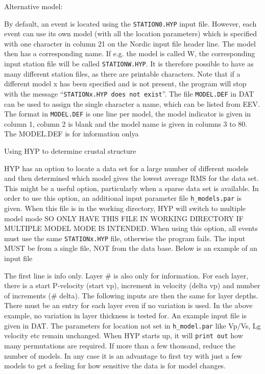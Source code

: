 Alternative model: 

By default, an event is located using the \texttt{STATION0.HYP} 
input file. However, each event can use its own model (with all the 
location parameters) which is specified with one character in column 
21 on the Nordic input file header line. The model then has a 
corresponding name. If e.g. the model is called W, the corresponding 
input station file will be called \texttt{STATIONW.HYP}. It is 
therefore possible to have as many different station files, as there 
are printable characters. Note that if a different model x has been 
specified and is not present, the program will stop with the message 
``\texttt{STATIONx.HYP does not exist}''. 
The file \texttt{MODEL.DEF} in DAT can be used 
to assign the single character a name, which can be listed from EEV. 
The format in \texttt{MODEL.DEF} is one line per model, the 
model indicator is given in column 1, column 2 is blank and the 
model name is given in columns 3 to 80. The MODEL.DEF is for information onlya 

Using HYP to determine crustal structure 

HYP has an option to locate a data set for a large number of different 
models and then determined which model gives the lowest average RMS 
for the data set. This might be a useful option, particularly when 
a sparse data set is available. In order to use this option, an 
additional input parameter file \texttt{h\_models.par} is given. 
When this file is in the working directory, HYP will switch to 
multiple model mode SO ONLY HAVE THIS FILE IN WORKING DIRECTORY IF 
MULTIPLE MODEL MODE IS INTENDED. When using this option, all events 
must use the same \texttt{STATIONx.HYP} file, otherwise the 
program fails. The input MUST be from a single file, NOT from the 
data base. Below is an example of an input file



The first line is info only. Layer \# is also only for information. 
For each layer, there is a start P-velocity (start vp), increment 
in velocity (delta vp) and number of increments (\# delta). The 
following inputs are then the same for layer depths. There must be 
an entry for each layer even if no variation is used. In the above 
example, no variation in layer thickness is tested for. An example 
input file is given in DAT. The parameters for location not set in 
\texttt{h\_model.par} like Vp/Vs, Lg velocity etc remain unchanged. 
When HYP starts up, it will \texttt{print out}  how many permutations are 
required. If more than a few thousand, reduce the number of models. 
In any case it is an advantage to first try with just a few models 
to get a feeling for how sensitive the data is for model changes. 

